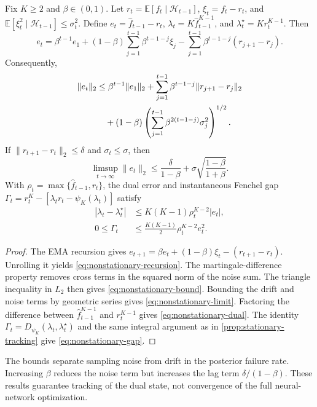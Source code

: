 \begin{proposition}
\label{prop:nonstationary-tracking}
Fix $K\geq2$ and $\beta\in(0,1)$.
Let $r_t=\mathbb E[f_t\mid\mathcal H_{t-1}]$, $\xi_t=f_t-r_t$, and $\mathbb E[\xi_t^2\mid\mathcal H_{t-1}]\leq\sigma_t^2$.
Define $e_t=\widehat f_{t-1}-r_t$, $\lambda_t=K\widehat f_{t-1}^{K-1}$, and $\lambda_t^\star=Kr_t^{K-1}$.
Then
\begin{equation}
  e_t
  =
  \beta^{t-1}e_1
  +(1-\beta)\sum_{j=1}^{t-1}\beta^{t-1-j}\xi_j
  -\sum_{j=1}^{t-1}\beta^{t-1-j}(r_{j+1}-r_j).
  \label{eq:nonstationary-recursion}
\end{equation}
Consequently,
\begin{align}
  \|e_t\|_2
  &\leq
  \beta^{t-1}\|e_1\|_2
  +
  \sum_{j=1}^{t-1}\beta^{t-1-j}\|r_{j+1}-r_j\|_2
  \notag\\
  &\quad+
  (1-\beta)
  \left(\sum_{j=1}^{t-1}\beta^{2(t-1-j)}\sigma_j^2\right)^{1/2}.
  \label{eq:nonstationary-bound}
\end{align}
If $\|r_{t+1}-r_t\|_2\leq\delta$ and $\sigma_t\leq\sigma$, then
\begin{equation}
  \limsup_{t\to\infty}\|e_t\|_2
  \leq
  \frac{\delta}{1-\beta}
  +
  \sigma\sqrt{\frac{1-\beta}{1+\beta}}.
  \label{eq:nonstationary-limit}
\end{equation}
With $\rho_t=\max\{\widehat f_{t-1},r_t\}$, the dual error and instantaneous Fenchel gap $\Gamma_t=r_t^K-[\lambda_t r_t-\psi_K(\lambda_t)]$ satisfy
\begin{align}
  |\lambda_t-\lambda_t^\star|
  &\leq K(K-1)\rho_t^{K-2}|e_t|,
  \label{eq:nonstationary-dual}\\
  0\leq\Gamma_t
  &\leq\frac{K(K-1)}{2}\rho_t^{K-2}e_t^2.
  \label{eq:nonstationary-gap}
\end{align}
\end{proposition}

\begin{proof}
The EMA recursion gives $e_{t+1}=\beta e_t+(1-\beta)\xi_t-(r_{t+1}-r_t)$.
Unrolling it yields \cref{eq:nonstationary-recursion}.
The martingale-difference property removes cross terms in the squared norm of the noise sum.
The triangle inequality in $L_2$ then gives \cref{eq:nonstationary-bound}.
Bounding the drift and noise terms by geometric series gives \cref{eq:nonstationary-limit}.
Factoring the difference between $\widehat f_{t-1}^{K-1}$ and $r_t^{K-1}$ gives \cref{eq:nonstationary-dual}.
The identity $\Gamma_t=D_{\psi_K}(\lambda_t,\lambda_t^\star)$ and the same integral argument as in \cref{prop:stationary-tracking} give \cref{eq:nonstationary-gap}.
\end{proof}

The bounds separate sampling noise from drift in the posterior failure rate.
Increasing $\beta$ reduces the noise term but increases the lag term $\delta/(1-\beta)$.
These results guarantee tracking of the dual state, not convergence of the full neural-network optimization.
